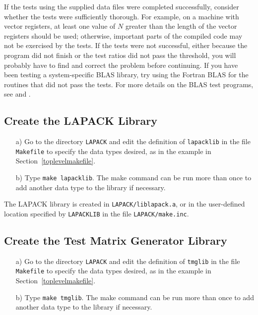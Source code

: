 \documentclass[11pt]{report}
\begin{document}
If the tests using the supplied data files were completed successfully,
consider whether the tests were sufficiently thorough.
For example, on a machine with vector registers, at least one value
of $N$ greater than the length of the vector registers should be used;
otherwise, important parts of the compiled code may not be
exercised by the tests.
If the tests were not successful, either because the program did not
finish or the test ratios did not pass the threshold, you will
probably have to find and correct the problem before continuing.
If you have been testing a system-specific
BLAS library, try using the Fortran BLAS for the routines that
did not pass the tests.
For more details on the BLAS test programs,
see \cite{BLAS2-test} and \cite{BLAS3-test}.

\subsection{Create the LAPACK Library}

\begin{itemize}
\item[a)]
Go to the directory \texttt{LAPACK} and edit the definition of
\texttt{lapacklib} in the file \texttt{Makefile} to specify the data types desired,
as in the example in Section~\ref{toplevelmakefile}.

\item[b)]
Type \texttt{make lapacklib}.
The make command can be run more than once to add another
data type to the library if necessary.

\end{itemize}

\noindent
The LAPACK library is created in \texttt{LAPACK/liblapack.a},
or in the user-defined location specified by \texttt{LAPACKLIB} in the file
\texttt{LAPACK/make.inc}.

\subsection{Create the Test Matrix Generator Library}

\begin{itemize}
\item[a)]
Go to the directory \texttt{LAPACK} and edit the definition of \texttt{tmglib}
in the file \texttt{Makefile} to specify the data types desired, as in the
example in Section~\ref{toplevelmakefile}.

\item[b)]
Type \texttt{make tmglib}.
The make command can be run more than once to add another
data type to the library if necessary.

\end{itemize}
\end{document}
